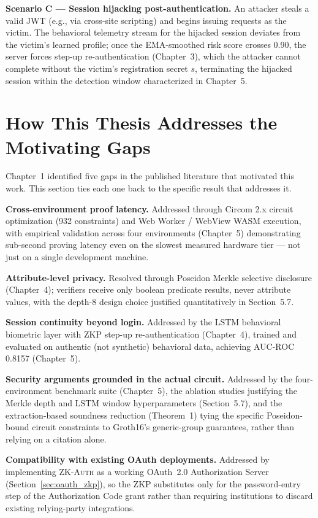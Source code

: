 \documentclass[12pt,a4paper,oneside]{report}
\begin{document}
\textbf{Scenario C --- Session hijacking post-authentication.} An
attacker steals a valid JWT (e.g., via cross-site scripting) and begins
issuing requests as the victim. The behavioral telemetry stream for the
hijacked session deviates from the victim's learned profile; once the
EMA-smoothed risk score crosses 0.90, the server forces step-up
re-authentication (Chapter~3), which the attacker cannot complete without
the victim's registration secret $s$, terminating the hijacked session
within the detection window characterized in Chapter~5.

\section{How This Thesis Addresses the Motivating Gaps}

Chapter~1 identified five gaps in the published literature that
motivated this work. This section ties each one back to the specific
result that addresses it.

\textbf{Cross-environment proof latency.} Addressed through Circom 2.x
circuit optimization (932 constraints) and Web Worker / WebView WASM
execution, with empirical validation across four environments
(Chapter~5) demonstrating sub-second proving latency even on the
slowest measured hardware tier --- not just on a single development
machine.

\textbf{Attribute-level privacy.} Resolved through Poseidon Merkle
selective disclosure (Chapter~4); verifiers receive only boolean
predicate results, never attribute values, with the depth-8 design choice
justified quantitatively in Section~5.7.

\textbf{Session continuity beyond login.} Addressed by the LSTM
behavioral biometric layer with ZKP step-up re-authentication
(Chapter~4), trained and evaluated on authentic (not synthetic)
behavioral data, achieving AUC-ROC 0.8157 (Chapter~5).

\textbf{Security arguments grounded in the actual circuit.} Addressed by
the four-environment benchmark suite (Chapter~5), the ablation studies
justifying the Merkle depth and LSTM window hyperparameters
(Section~5.7), and the extraction-based soundness reduction (Theorem~1)
tying the specific Poseidon-bound circuit constraints to Groth16's
generic-group guarantees, rather than relying on a citation alone.

\textbf{Compatibility with existing OAuth deployments.} Addressed by
implementing \textsc{ZK-Auth} as a working OAuth~2.0 Authorization
Server (Section~\ref{sec:oauth_zkp}), so the ZKP substitutes only for
the password-entry step of the Authorization Code grant rather than
requiring institutions to discard existing relying-party integrations.
\end{document}
